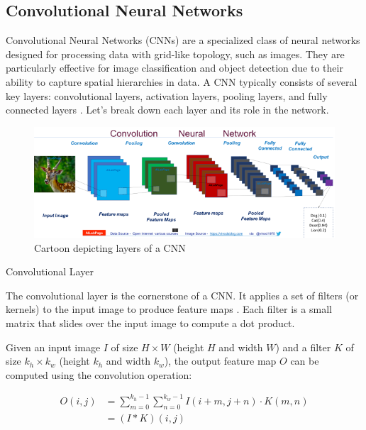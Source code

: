 \subsection{Convolutional Neural Networks}

Convolutional Neural Networks (CNNs) are a specialized class of neural networks designed for processing data with grid-like topology, such as images\cite{LeCun_Bengio_Hinton_2015}.
They are particularly effective for image classification and object detection due to their ability to capture spatial hierarchies in data.
A CNN typically consists of several key layers: convolutional layers, activation layers, pooling layers, and fully connected layers \cite{Venkatesan_Li_2018}.
Let's break down each layer and its role in the network.

\begin{figure}[H]
  \centering
  \includegraphics[width=120mm]{figures/cnn.png}
  \caption{Cartoon depicting layers of a CNN\cite{cnn_pic}}
  \label{cnn}
\end{figure}

Convolutional Layer

The convolutional layer is the cornerstone of a CNN.
It applies a set of filters (or kernels) to the input image to produce feature maps \cite{IBM_2024}.
Each filter is a small matrix that slides over the input image to compute a dot product.

Given an input image \( I \) of size \( H \times W \) (height \( H \) and width \( W \)) and a filter \( K \) of size \( k_h \times k_w \) (height \( k_h \) and width \( k_w \)), the output feature map \( O \) can be computed using the convolution operation:

\begin{align}
  O(i, j) &= \sum_{m=0}^{k_h-1} \sum_{n=0}^{k_w-1} I(i+m, j+n) \cdot K(m, n) \\
          &= (I * K)(i, j)
\end{align}

